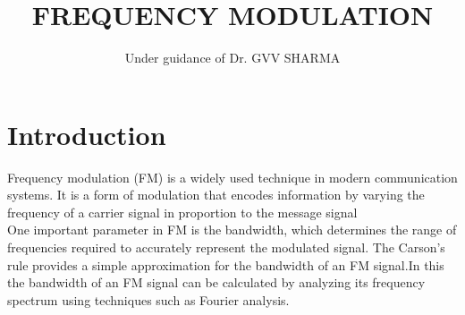\documentclass[journal,5pt,twocolumn]{IEEEtran}
\renewcommand\thesection{\arabic{section}}
\begin{document}
\let\StandardTheFigure\thefigure
\let\StandardTheFigure\thefigure
\let\StandardTheTable\thetable
\let\vec\mathbf
\def\putbox#1#2#3{\makebox[0in][l]{\makebox[#1][l]{}\raisebox{\baselineskip}[0in][0in]{\raisebox{#2}[0in][0in]{#3}}}}
     \def\rightbox#1{\makebox[0in][r]{#1}}
     \def\centbox#1{\makebox[0in]{#1}}
     \def\topbox#1{\raisebox{-\baselineskip}[0in][0in]{#1}}
     \def\midbox#1{\raisebox{-0.5\baselineskip}[0in][0in]{#1}}
\title{ 
FREQUENCY MODULATION
}
\author{ Under guidance of Dr. GVV SHARMA}%
\maketitle
\tableofcontents
\section{\textbf{Introduction}}
Frequency modulation (FM) is a widely used technique in modern communication systems. It is a form of modulation that encodes information by varying the frequency of a carrier signal in proportion to the message signal\\
One important parameter in FM is the bandwidth, which determines the range of frequencies required to accurately represent the modulated signal. The Carson's rule provides a simple approximation for the bandwidth of an FM signal.In this the bandwidth of an FM signal can be calculated by analyzing its frequency spectrum using techniques such as Fourier analysis.
\end{document}

